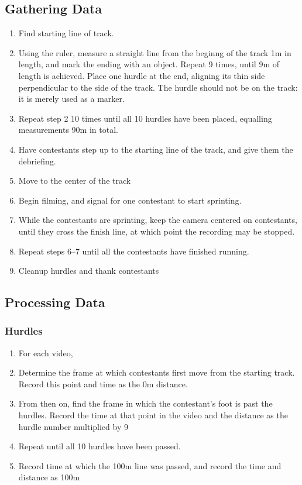 \documentclass[index]{subfiles}
\begin{document}
\subsection{Gathering Data}
\begin{enumerate}
    \item Find starting line of track.
    \item Using the ruler, measure a straight line from the beginng of the track 1m in length, and mark the ending with an object. Repeat 9 times, until 9m of length is achieved. Place one hurdle at the end, aligning its thin side perpendicular to the side of the track. The hurdle should not be on the track: it is merely used as a marker.
    \item Repeat step 2 10 times until all 10 hurdles have been placed, equalling measurements 90m in total.
    \item Have contestants step up to the starting line of the track, and give them the debriefing.
    \item Move to the center of the track
    \item Begin filming, and signal for one contestant to start sprinting.
    \item While the contestants are sprinting, keep the camera centered on contestants, until they cross the finish line, at which point the recording may be stopped.
    \item Repeat steps 6--7 until all the contestants have finished running.
    \item Cleanup hurdles and thank contestants
\end{enumerate}

\subsection{Processing Data}
\subsubsection*{Hurdles}
\begin{enumerate}
    \item For each video,
    \item Determine the frame at which contestants first move from the starting track. Record this point and time as the 0m distance.
    \item From then on, find the frame in which the contestant's foot is past the hurdles. Record the time at that point in the video and the distance as the hurdle number multiplied by 9
    \item Repeat until all 10 hurdles have been passed.
    \item Record time at which the 100m line was passed, and record the time and distance as 100m
\end{enumerate}
\end{document}
